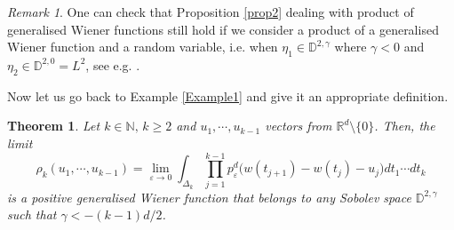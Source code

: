 \documentclass[]{interact}
\newcommand{\R}{{\mathbb{R}}}
\newcommand{\D}{{\mathbb{D}}}
\newcommand{\1}{\mathbf{1}}
\theoremstyle{plain}%
\newtheorem{thm}{Theorem}[section]
\theoremstyle{definition}
\theoremstyle{remark}
\newtheorem{remark}{Remark}
\begin{document}
\begin{remark}
One can check that Proposition \ref{prop2} dealing with product of generalised Wiener functions still hold if we consider a product of a generalised Wiener function and a random variable, i.e. when $\eta_1\in \mathbb{D}^{2,\gamma}$ where $\gamma <0$ and $\eta_2\in \mathbb{D}^{2,0}=L^2$, see e.g. \cite{Mall97,Kuo95}.
\end{remark} 

Now let us go back to Example \ref{Example1} and give it an appropriate definition.

\begin{thm} \label{PGWF}
Let $k\in \mathbb{N},\, k\geqslant 2$ and $u_1,\cdots, u_{k-1}$ vectors from $\R^d\setminus\{0\}$. Then, the limit
$$ \rho_k(u_1,\cdots,u_{k-1})=\lim_{\varepsilon \to 0}\int_{\Delta_k} \prod_{j=1}^{k-1}  p^d_{\varepsilon}\big( w(t_{j+1})-w(t_j)-u_j\big)dt_1\cdots dt_k $$
is a positive generalised Wiener function that belongs to any Sobolev space $\D^{2,\gamma}$ such that $\gamma < -(k-1)d/2$. 
\end{thm}
\end{document}
